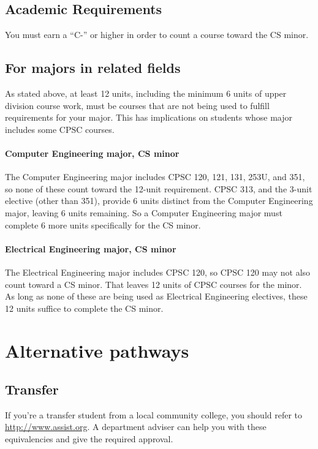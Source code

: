\documentclass{book}
\begin{document}
\section{Academic Requirements}

You must earn a ``C-'' or higher in order to count a course toward the CS minor.

\section{For majors in related fields}

As stated above, at least 12 units, including the minimum 6 units of upper division course work, must be courses that are not being used to fulfill requirements for your major. This has implications on students whose major includes some CPSC courses.

\subsubsection{Computer Engineering major, CS minor}

The Computer Engineering major includes CPSC 120, 121, 131, 253U, and 351, so none of these count toward the 12-unit requirement. CPSC 313, and the 3-unit elective (other than 351), provide 6 units distinct from the Computer Engineering major, leaving 6 units remaining. So a Computer Engineering major must complete 6 more units specifically for the CS minor.

\subsubsection{Electrical Engineering major, CS minor}

The Electrical Engineering major includes CPSC 120, so CPSC 120 may not also count toward a CS minor. That leaves 12 units of CPSC courses for the minor. As long as none of these are being used as Electrical Engineering electives, these 12 units suffice to complete the CS minor.

\chapter{Alternative pathways}

\section{Transfer}

If you're a transfer student from a local community college, you should refer to \url{http://www.assist.org}. A department adviser can help you with these equivalencies and give the required approval.
\end{document}
